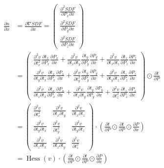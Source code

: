 \documentclass[12pt]{article}
\newcommand{\pardiff}[2]{\frac{\partial #1}{\partial #2} }
\newcommand{\pardiffsqsame}[2]{\frac{\partial^2 #1}{\partial #2^2} }
\newcommand{\pardiffsq}[3]{\frac{\partial^2 #1}{\partial #2 \partial #3} }
\newcommand{\newlinell}{\\[0.6em]}
\DeclareMathOperator{\Hessian}{Hess}
\begin{document}
\begin{equation}
\begin{aligned}
\pardiff{n}{x} &= \pardiff{\nabla SDF}{x} = 
\begin{pmatrix}
\pardiffsq{SDF}{P_x}{x} \newlinell
\pardiffsq{SDF}{P_y}{x} \newlinell
\pardiffsq{SDF}{P_z}{x}
\end{pmatrix} \newlinell
&=
\begin{pmatrix}
\pardiffsqsame{v}{t_x} \pardiff{t_x}{P_x} \pardiff{P_x}{x} + \pardiffsq{v}{t_x}{t_y} \pardiff{t_y}{P_y} \pardiff{P_y}{x} + \pardiffsq{v}{t_x}{t_z} \pardiff{t_z}{P_z} \pardiff{P_z}{x} \newlinell
\pardiffsq{v}{t_y}{t_x} \pardiff{t_x}{P_x} \pardiff{P_x}{x} + \pardiffsqsame{v}{t_y} \pardiff{t_y}{P_y} \pardiff{P_y}{x} + \pardiffsq{v}{t_y}{t_z} \pardiff{t_z}{P_z} \pardiff{P_z}{x} \newlinell
\pardiffsq{v}{t_z}{t_x} \pardiff{t_x}{P_x} \pardiff{P_x}{x} + \pardiffsq{v}{t_z}{t_y} \pardiff{t_y}{P_y} \pardiff{P_y}{x} + \pardiffsqsame{v}{t_z} \pardiff{t_z}{P_z} \pardiff{P_z}{x}
\end{pmatrix}
\odot \pardiff{t}{P} \newlinell
&=
\begin{pmatrix}
\pardiffsqsame{v}{t_x} & \pardiffsq{v}{t_x}{t_y} & \pardiffsq{v}{t_x}{t_z} \newlinell
\pardiffsq{v}{t_y}{t_x} & \pardiffsqsame{v}{t_y} & \pardiffsq{v}{t_y}{t_z} \newlinell
\pardiffsq{v}{t_z}{t_x} & \pardiffsq{v}{t_z}{t_y} & \pardiffsqsame{v}{t_z}
\end{pmatrix}
\cdot \left( \pardiff{t}{P} \odot \pardiff{t}{P} \odot \pardiff{P}{x} \right) \newlinell
&= \Hessian(v) \cdot \left(\pardiff{t}{P} \odot \pardiff{t}{P} \odot \pardiff{P}{x} \right)
\end{aligned}
\end{equation}



\end{document}
